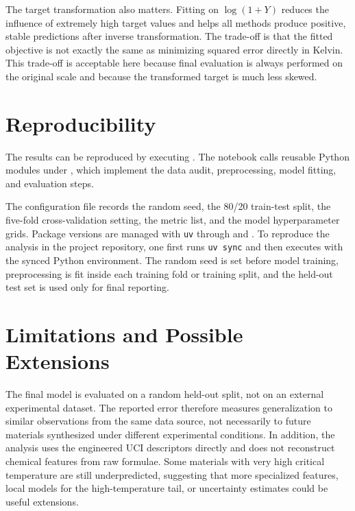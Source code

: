 \documentclass[11pt,a4paper]{article}
\begin{document}
The target transformation also matters. Fitting on \(\log(1+Y)\) reduces the
influence of extremely high target values and helps all methods produce positive,
stable predictions after inverse transformation. The trade-off is that the fitted
objective is not exactly the same as minimizing squared error directly in Kelvin.
This trade-off is acceptable here because final evaluation is always performed on
the original scale and because the transformed target is much less skewed.

\section{Reproducibility}

The results can be reproduced by executing
. The notebook calls reusable Python
modules under , which implement the data audit, preprocessing, model
fitting, and evaluation steps.

The configuration file  records the random seed, the
80/20 train-test split, the five-fold cross-validation setting, the metric list,
and the model hyperparameter grids. Package versions are managed with
\texttt{uv} through  and . To reproduce the
analysis in the project repository, one first runs \texttt{uv sync} and then
executes  with the synced Python
environment. The random seed is set before model training, preprocessing is fit
inside each training fold or training split, and the held-out test set is used
only for final reporting.

\section{Limitations and Possible Extensions}

The final model is evaluated on a random held-out split, not on an external
experimental dataset. The reported error therefore measures generalization to
similar observations from the same data source, not necessarily to future
materials synthesized under different experimental conditions. In addition, the
analysis uses the engineered UCI descriptors directly and does not reconstruct
chemical features from raw formulae. Some materials with very high critical
temperature are still underpredicted, suggesting that more specialized features,
local models for the high-temperature tail, or uncertainty estimates could be
useful extensions.
\end{document}
